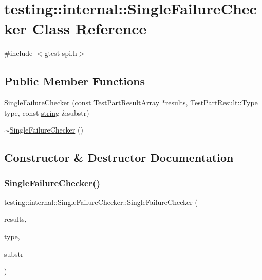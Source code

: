 \hypertarget{classtesting_1_1internal_1_1_single_failure_checker}{}\section{testing\+:\+:internal\+:\+:Single\+Failure\+Checker Class Reference}
\label{classtesting_1_1internal_1_1_single_failure_checker}


{\ttfamily \#include $<$gtest-\/spi.\+h$>$}

\subsection*{Public Member Functions}
\begin{DoxyCompactItemize}
\item 
\hyperlink{classtesting_1_1internal_1_1_single_failure_checker_a6d350d385526c97c9982e928f5f8fb56}{Single\+Failure\+Checker} (const \hyperlink{classtesting_1_1_test_part_result_array}{Test\+Part\+Result\+Array} $\ast$results, \hyperlink{classtesting_1_1_test_part_result_a65ae656b33fdfdfffaf34858778a52d5}{Test\+Part\+Result\+::\+Type} type, const \hyperlink{namespacetesting_1_1internal_a8e8ff5b11e64078831112677156cb111}{string} \&substr)
\item 
\hyperlink{classtesting_1_1internal_1_1_single_failure_checker_a4b0a907c9c1b350c79d70af138e9f0bf}{$\sim$\+Single\+Failure\+Checker} ()
\end{DoxyCompactItemize}


\subsection{Constructor \& Destructor Documentation}
\mbox{\label{classtesting_1_1internal_1_1_single_failure_checker_a6d350d385526c97c9982e928f5f8fb56}} 
\subsubsection{\texorpdfstring{Single\+Failure\+Checker()}{SingleFailureChecker()}}
{\footnotesize\ttfamily testing\+::internal\+::\+Single\+Failure\+Checker\+::\+Single\+Failure\+Checker (\begin{DoxyParamCaption}\item[{const \hyperlink{classtesting_1_1_test_part_result_array}{Test\+Part\+Result\+Array} $\ast$}]{results,  }\item[{\hyperlink{classtesting_1_1_test_part_result_a65ae656b33fdfdfffaf34858778a52d5}{Test\+Part\+Result\+::\+Type}}]{type,  }\item[{const \hyperlink{namespacetesting_1_1internal_a8e8ff5b11e64078831112677156cb111}{string} \&}]{substr }\end{DoxyParamCaption})}

